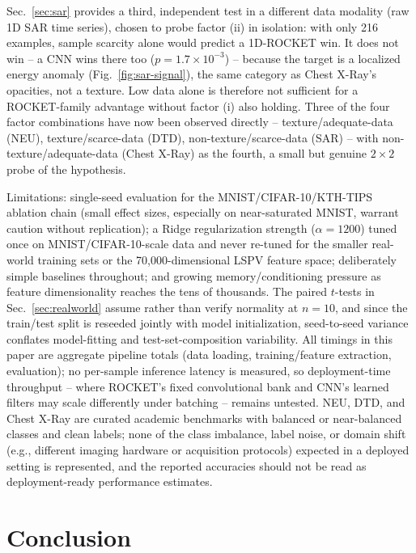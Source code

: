 \documentclass[a4paper,fleqn]{cas-sc}
\begin{document}
Sec.~\ref{sec:sar} provides a third, independent test in a different data modality (raw 1D SAR time series), chosen to probe factor (ii) in isolation: with only 216 examples, sample scarcity alone would predict a 1D-ROCKET win. It does not win -- a CNN wins there too ($p=1.7\times10^{-3}$) -- because the target is a localized energy anomaly (Fig.~\ref{fig:sar-signal}), the same category as Chest X-Ray's opacities, not a texture. Low data alone is therefore not sufficient for a ROCKET-family advantage without factor (i) also holding. Three of the four factor combinations have now been observed directly -- texture/adequate-data (NEU), texture/scarce-data (DTD), non-texture/scarce-data (SAR) -- with non-texture/adequate-data (Chest X-Ray) as the fourth, a small but genuine $2\times2$ probe of the hypothesis.

Limitations: single-seed evaluation for the MNIST/CIFAR-10/KTH-TIPS ablation chain (small effect sizes, especially on near-saturated MNIST, warrant caution without replication); a Ridge regularization strength ($\alpha=1200$) tuned once on MNIST/CIFAR-10-scale data and never re-tuned for the smaller real-world training sets or the 70,000-dimensional LSPV feature space; deliberately simple baselines throughout; and growing memory/conditioning pressure as feature dimensionality reaches the tens of thousands. The paired $t$-tests in Sec.~\ref{sec:realworld} assume rather than verify normality at $n=10$, and since the train/test split is reseeded jointly with model initialization, seed-to-seed variance conflates model-fitting and test-set-composition variability. All timings in this paper are aggregate pipeline totals (data loading, training/feature extraction, evaluation); no per-sample inference latency is measured, so deployment-time throughput -- where ROCKET's fixed convolutional bank and CNN's learned filters may scale differently under batching -- remains untested. NEU, DTD, and Chest X-Ray are curated academic benchmarks with balanced or near-balanced classes and clean labels; none of the class imbalance, label noise, or domain shift (e.g., different imaging hardware or acquisition protocols) expected in a deployed setting is represented, and the reported accuracies should not be read as deployment-ready performance estimates.

\section{Conclusion}\label{sec:conclusion}
\end{document}
